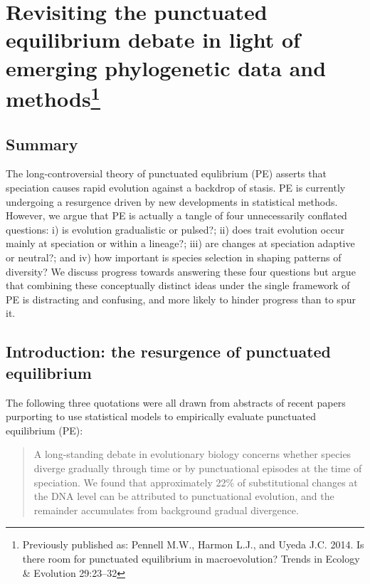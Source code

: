 \chapter[Revisiting the punctuated equilibrium debate in light of emerging phylogenetic data and methods]{Revisiting the punctuated equilibrium debate in light of emerging phylogenetic data and methods\footnote{Previously published as: Pennell M.W., Harmon L.J., and Uyeda J.C. 2014.
  Is there room for punctuated equilibrium in macroevolution?
  Trends in Ecology \& Evolution 29:23--32}}
\label{chap:punceq}

\section{Summary}

The long-controversial theory of punctuated equlibrium (PE) asserts that speciation causes rapid evolution against a backdrop of stasis. PE is currently undergoing a resurgence driven by new developments in statistical methods. However, we argue that PE is actually a tangle of four unnecessarily conflated questions: i) is evolution gradualistic or pulsed?; ii) does trait evolution occur mainly at speciation or within a lineage?; iii) are changes at speciation adaptive or neutral?; and iv) how important is species selection in shaping patterns of diversity? We discuss progress towards answering these four questions but argue that combining these conceptually distinct ideas under the single framework of PE is distracting and confusing, and more likely to hinder progress than to spur it.


\section{Introduction: the resurgence of punctuated equilibrium}

The following three quotations were all drawn from abstracts of recent papers purporting to use statistical models to empirically evaluate punctuated equilibrium (PE):

\begin{quote}
\singlespacing
A long-standing debate in evolutionary biology concerns whether species diverge gradually through time or by punctuational episodes at the time of speciation. We found that approximately 22\% of substitutional changes at the DNA level can be attributed to punctuational evolution, and the remainder accumulates from background gradual divergence. \citep[][p. 119]{Pagel2006}
\end{quote}

